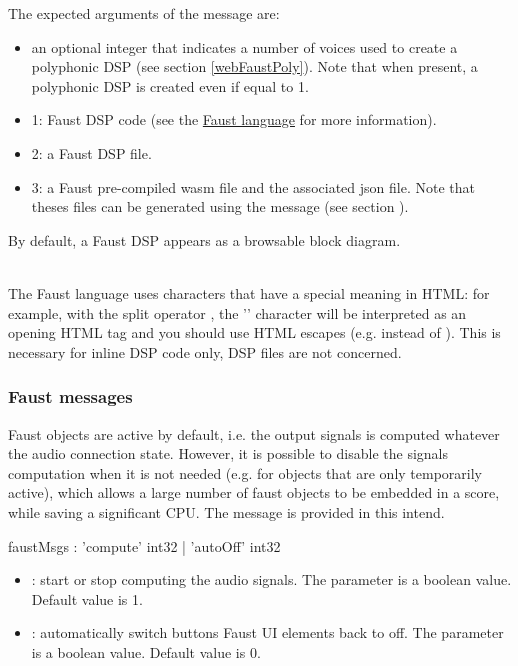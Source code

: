 \documentclass[a4paper,twoside]{article}
\newcommand{\subsublevel}[1]	{\subsubsection{#1}}
\begin{document}
The expected arguments of the  message are:
\begin{itemize}
\item an optional integer that indicates a number of voices used to create a polyphonic DSP (see section \ref{webFaustPoly}). Note that when present, a polyphonic DSP is created even if equal to 1.
\item 1: Faust DSP code (see the \href{https://faustdoc.grame.fr/}{Faust language} for more information).
\item 2: a Faust DSP file.
\item 3: a Faust pre-compiled wasm file and the associated json file. Note that theses files can be generated using the  message (see section ). 
\end{itemize}

By default, a Faust DSP appears as a browsable block diagram.

\note{}\\
The Faust language uses characters that have a special meaning in HTML: for example, with the split operator \OSC{<:}, the '\OSC{<}' character will be interpreted as an opening HTML tag and you should use HTML escapes (e.g.  instead of \OSC{<}). This is necessary for inline DSP code only, DSP files are not concerned.

\subsublevel{Faust messages}
\label{webFaustMsgs}

Faust objects are active by default, i.e. the output signals is computed whatever the audio connection state. 
However, it is possible to disable the signals computation when it is not needed (e.g. for objects that are only temporarily active), which allows a large number of faust objects to be embedded in a score, while saving a significant CPU. The  message is provided in this intend.

\begin{rail}
faustMsgs : 'compute' int32
			| 'autoOff' int32
\end{rail}

\begin{itemize}
\item {}: start or stop computing the audio signals. The parameter is a boolean value. Default value is 1.
\item {}: automatically switch buttons Faust UI elements back to off. The parameter is a boolean value. Default value is 0.
\end{itemize}
\end{document}
